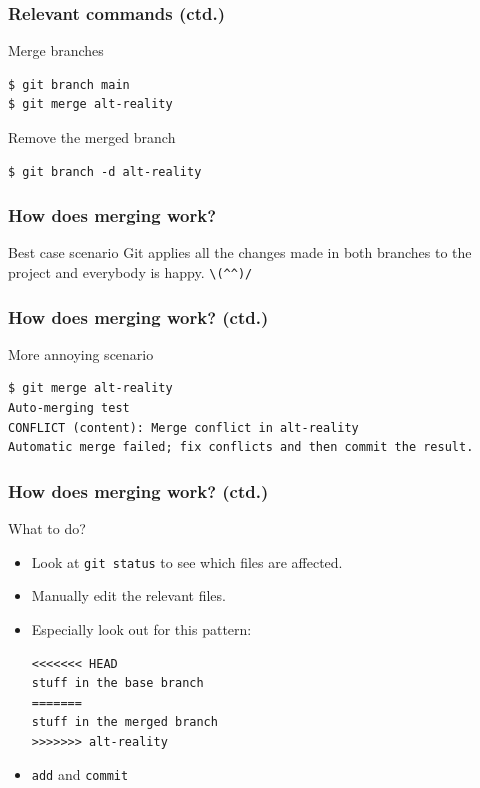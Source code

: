 \documentclass[12pt]{beamer}
\begin{document}
\begin{frame}[fragile]
  \frametitle{Relevant commands (ctd.)}

  \begin{block}{Merge branches}
    {\footnotesize{}%
      \begin{verbatim}
$ git branch main
$ git merge alt-reality
      \end{verbatim}%
    }
  \end{block}

  \begin{block}{Remove the merged branch}
    {\footnotesize{}%
      \begin{verbatim}
$ git branch -d alt-reality
      \end{verbatim}%
    }
  \end{block}
\end{frame}

\begin{frame}[fragile]
  \frametitle{How does merging work?}

  \begin{block}{Best case scenario}
    Git applies all the changes made in both branches to the project and
    everybody is happy. \verb"\(^^)/"
  \end{block}
\end{frame}

\begin{frame}[fragile]
  \frametitle{How does merging work? (ctd.)}

  \begin{block}{More annoying scenario}
    {\footnotesize{}%
      \begin{verbatim}
$ git merge alt-reality
Auto-merging test
CONFLICT (content): Merge conflict in alt-reality
Automatic merge failed; fix conflicts and then commit the result.
      \end{verbatim}%
    }
  \end{block}
\end{frame}

\begin{frame}[fragile]
  \frametitle{How does merging work? (ctd.)}

  \begin{block}{What to do?}
    \begin{itemize}
      \item Look at \texttt{git status} to see which files are affected.
      \item Manually edit the relevant files.
      \item Especially look out for this pattern:
        {\footnotesize{}%
          \begin{verbatim}
<<<<<<< HEAD
stuff in the base branch
=======
stuff in the merged branch
>>>>>>> alt-reality
          \end{verbatim}%
        }
      \item\texttt{add} and \texttt{commit}
    \end{itemize}
  \end{block}
\end{frame}
\end{document}
